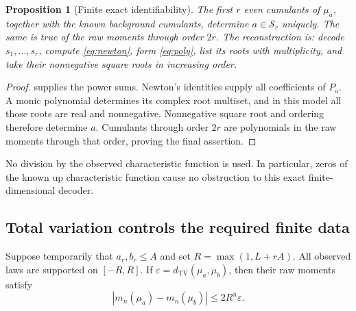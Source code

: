 \documentclass[11pt,a4paper]{article}
\numberwithin{equation}{section}
\newtheorem{proposition}[proposition]{Proposition}
\theoremstyle{definition}
\theoremstyle{remark}
\newcommand{\TV}{d_{\mathrm{TV}}}
\newcommand{\sr}{\mathcal S_r}
\begin{document}
\begin{proposition}[Finite exact identifiability]
\label{prop:exact}
The first $r$ even cumulants of $\mu_a$, together with the known background
cumulants, determine $a\in\sr$ uniquely.  The same is true of the raw moments
through order $2r$.  The reconstruction is: decode $s_1,\ldots,s_r$, compute
\eqref{eq:newton}, form \eqref{eq:poly}, list its roots with multiplicity, and take
their nonnegative square roots in increasing order.
\end{proposition}
\begin{proof}
 supplies the power sums.  Newton's identities supply all
coefficients of $P_a$.  A monic polynomial determines its complex root multiset,
and in this model all those roots are real and nonnegative.  Nonnegative square
root and ordering therefore determine $a$.  Cumulants through order $2r$ are
polynomials in the raw moments through that order, proving the final assertion.
\end{proof}
No division by the observed characteristic function is used.  In particular,
zeros of the known up characteristic function cause no obstruction to this
exact finite-dimensional decoder.

\subsection{Total variation controls the required finite data}
Suppose temporarily that $a_r,b_r\le A$ and set $R=\max(1,L+rA)$.
All observed laws are supported on $[-R,R]$.  If
$\varepsilon=\TV(\mu_a,\mu_b)$, then their raw moments satisfy
\begin{equation}
 |m_n(\mu_a)-m_n(\mu_b)|\le2R^n\varepsilon.
 \label{eq:raw-bound}
\end{equation}
\end{document}
